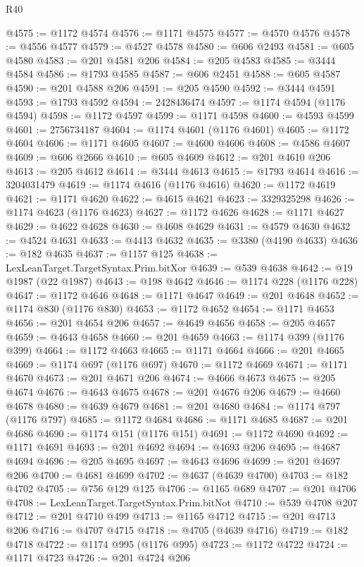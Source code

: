 \begin{lexlean}{R40}
\begin{coremodule}
@4575 := @1172 @4574
@4576 := @1171 @4575
@4577 := @4570 @4576
@4578 := @4556 @4577
@4579 := @4527 @4578
@4580 := @606 @2493
@4581 := @605 @4580
@4583 := @201 @4581 @206
@4584 := @205 @4583
@4585 := @3444 @4584
@4586 := @1793 @4585
@4587 := @606 @2451
@4588 := @605 @4587
@4590 := @201 @4588 @206
@4591 := @205 @4590
@4592 := @3444 @4591
@4593 := @1793 @4592
@4594 := 2428436474
@4597 := @1174 @4594 (@1176 @4594)
@4598 := @1172 @4597
@4599 := @1171 @4598
@4600 := @4593 @4599
@4601 := 2756734187
@4604 := @1174 @4601 (@1176 @4601)
@4605 := @1172 @4604
@4606 := @1171 @4605
@4607 := @4600 @4606
@4608 := @4586 @4607
@4609 := @606 @2666
@4610 := @605 @4609
@4612 := @201 @4610 @206
@4613 := @205 @4612
@4614 := @3444 @4613
@4615 := @1793 @4614
@4616 := 3204031479
@4619 := @1174 @4616 (@1176 @4616)
@4620 := @1172 @4619
@4621 := @1171 @4620
@4622 := @4615 @4621
@4623 := 3329325298
@4626 := @1174 @4623 (@1176 @4623)
@4627 := @1172 @4626
@4628 := @1171 @4627
@4629 := @4622 @4628
@4630 := @4608 @4629
@4631 := @4579 @4630
@4632 := @4524 @4631
@4633 := @4413 @4632
@4635 := @3380 (@4190 @4633)
@4636 := @182 @4635
@4637 := @1157 @125
@4638 := LexLeanTarget.TargetSyntax.Prim.bitXor
@4639 := @539 @4638
@4642 := @19 @1987 (@22 @1987)
@4643 := @198 @4642
@4646 := @1174 @228 (@1176 @228)
@4647 := @1172 @4646
@4648 := @1171 @4647
@4649 := @201 @4648
@4652 := @1174 @830 (@1176 @830)
@4653 := @1172 @4652
@4654 := @1171 @4653
@4656 := @201 @4654 @206
@4657 := @4649 @4656
@4658 := @205 @4657
@4659 := @4643 @4658
@4660 := @201 @4659
@4663 := @1174 @399 (@1176 @399)
@4664 := @1172 @4663
@4665 := @1171 @4664
@4666 := @201 @4665
@4669 := @1174 @697 (@1176 @697)
@4670 := @1172 @4669
@4671 := @1171 @4670
@4673 := @201 @4671 @206
@4674 := @4666 @4673
@4675 := @205 @4674
@4676 := @4643 @4675
@4678 := @201 @4676 @206
@4679 := @4660 @4678
@4680 := @4639 @4679
@4681 := @201 @4680
@4684 := @1174 @797 (@1176 @797)
@4685 := @1172 @4684
@4686 := @1171 @4685
@4687 := @201 @4686
@4690 := @1174 @151 (@1176 @151)
@4691 := @1172 @4690
@4692 := @1171 @4691
@4693 := @201 @4692
@4694 := @4693 @206
@4695 := @4687 @4694
@4696 := @205 @4695
@4697 := @4643 @4696
@4699 := @201 @4697 @206
@4700 := @4681 @4699
@4702 := @4637 (@4639 @4700)
@4703 := @182 @4702
@4705 := @756 @129 @125
@4706 := @1165 @689
@4707 := @201 @4706
@4708 := LexLeanTarget.TargetSyntax.Prim.bitNot
@4710 := @539 @4708 @207
@4712 := @201 @4710 @499
@4713 := @1165 @4712
@4715 := @201 @4713 @206
@4716 := @4707 @4715
@4718 := @4705 (@4639 @4716)
@4719 := @182 @4718
@4722 := @1174 @995 (@1176 @995)
@4723 := @1172 @4722
@4724 := @1171 @4723
@4726 := @201 @4724 @206

\end{coremodule}
\end{lexlean}

